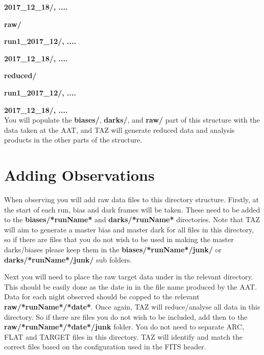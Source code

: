 \documentclass[12pt]{article}
\begin{document}
\hspace{20mm} \textbf{2017\_12\_18/, ....}
\vspace{1mm}

\hspace{10mm} \textbf{raw/} 
\vspace{1mm}

\hspace{15mm} \textbf{run1\_2017\_12/, ....} 
\vspace{1mm}

\hspace{20mm} \textbf{2017\_12\_18/, ....} 
\vspace{1mm}

\hspace{10mm} \textbf{reduced/}
\vspace{1mm}

\hspace{15mm} \textbf{run1\_2017\_12/, ....} 
\vspace{1mm}

\hspace{20mm} \textbf{2017\_12\_18/, ....} \\

You will populate the \textbf{biases/}, \textbf{darks/}, and \textbf{raw/} part of this structure with the data taken at the AAT, and TAZ will generate reduced data and analysis products in the other parts of the structure.  


\section{Adding Observations}

When observing you will add raw data files to this directory structure. Firstly, at the start of each run, bias and dark frames will be taken. These need to be added to the \textbf{biases/*runName*} and \textbf{darks/*runName*} directories. Note that TAZ will aim to generate a master bias and master dark for all files in this directory, so if there are files that you do not wish to be used in making the master darks/biases please keep them in the  \textbf{biases/*runName*/junk/} or \textbf{darks/*runName*/junk/} sub folders.

Next you will need to place the raw target data under in the relevant directory. This should be easily done as the date in in the file name produced by the AAT. Data for each night observed should be copped to the relevant \textbf{raw/*runName*/*date*}. Once again, TAZ will reduce/analyse all data in this directory. So if there are files you do not wish to be included, add then to the \textbf{raw/*runName*/*date*/junk} folder. You do not need to separate ARC, FLAT and TARGET files in this directory. TAZ will identify and match the correct files based on the configuration used in the FITS header.  
\end{document}
